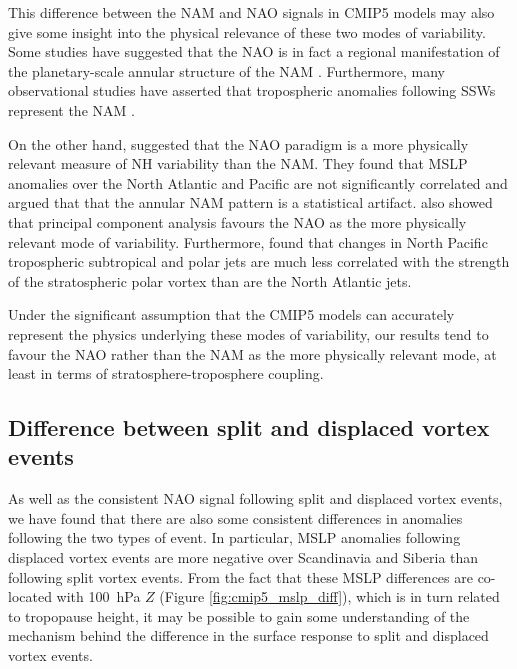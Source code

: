 This difference between the NAM and NAO signals in CMIP5 models may also give
some insight into the physical relevance of these two modes of variability. Some
studies have suggested that the NAO is in fact a regional manifestation of the
planetary-scale annular structure of the NAM \citep[e.g.,][]{Thompson1998,
  Wallace2002}. Furthermore, many observational studies have asserted that
tropospheric anomalies following SSWs represent the NAM
\citep[e.g.,][]{Baldwin1999,Baldwin2001a,Thompson2000}. 

On the other hand, \citet{Ambaum2001} suggested that the NAO paradigm is a more
physically relevant measure of NH variability than the NAM. They found that MSLP
anomalies over the North Atlantic and Pacific are not significantly correlated
and argued that that the annular NAM pattern is a statistical
artifact. \citet{Huth2006} also showed that principal component analysis favours
the NAO as the more physically relevant mode of variability. Furthermore,
\citet{Ambaum2002} found that changes in North Pacific tropospheric subtropical
and polar jets are much less correlated with the strength of the stratospheric
polar vortex than are the North Atlantic jets.

Under the significant assumption that the CMIP5 models can accurately represent
the physics underlying these modes of variability, our results tend to favour
the NAO rather than the NAM as the more physically relevant mode, at least in
terms of stratosphere-troposphere coupling. 





\subsection{Difference between split and displaced vortex events}
\label{sec:cmip5_discuss_split_displ}

As well as the consistent NAO signal following split and displaced vortex
events, we have found that there are also some consistent differences in
anomalies following the two types of event. In particular, MSLP anomalies
following displaced vortex events are more negative over Scandinavia and Siberia
than following split vortex events. From the fact that these MSLP differences
are co-located with 100~hPa $Z$ (Figure \ref{fig:cmip5_mslp_diff}), which is in
turn related to tropopause height, it may be possible to gain some understanding
of the mechanism behind the difference in the surface response to split and
displaced vortex events. 

